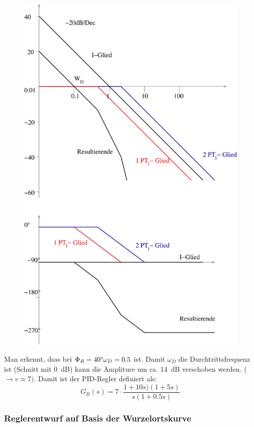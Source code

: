 \message{ !name(Mitschrieb_SysRegel.tex)}\documentclass[12pt,a4paper,ngerman]{scrartcl}
\begin{document}
\begin{figure}[H]
  \centering
  \includegraphics[width=.7\linewidth]{sysregel_bode_5-4}
\end{figure}
Man erkennt, dsas bei $\Phi_R=40\degree \omega_D=0.5$ ist. Damit $ \omega_D$ die Durchtrittsfrequenz ist (Schnitt mit 0~dB) kann die Ampliture um ca. 14~dB verschoben werden. ($\rightarrow v\approx 7)$. Damit ist der PID-Regler definiert als:
\[
G_R(s)=7\cdot \frac{1+10s)(1+5s)}{s(1+0.5s)}
\]

\subsubsection{Reglerentwurf auf Basis der Wurzelortskurve}
\end{document}
